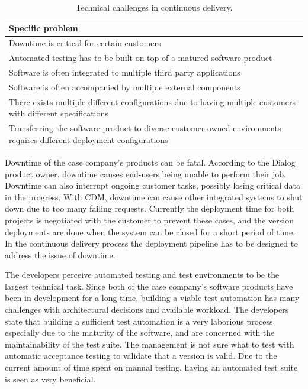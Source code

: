 \documentclass[english, grading]{tktltiki2}
\theoremstyle{definition}
\theoremstyle{remark}
\begin{document}
\begin{center}
\begin{table}[htb]
    \begin{tabular}{ | p{12cm} |}
    \hline
    \textbf{Specific problem} \\ \hline
    Downtime is critical for certain customers \\ \hline
    Automated testing has to be built on top of a matured software product \\ \hline
    Software is often integrated to multiple third party applications \\ \hline
    Software is often accompanied by multiple external components \\ \hline
    There exists multiple different configurations due to having multiple customers with different specifications \\ \hline
    Transferring the software product to diverse customer-owned environments requires different deployment configurations \\ 
    \hline
    \end{tabular}
    \caption{Technical challenges in continuous delivery.}
    \end{table}
\end{center}
Downtime of the case company's products can be fatal. According to the Dialog product owner, downtime causes end-users being unable to perform their job. Downtime can also interrupt ongoing customer tasks, possibly losing critical data in the progress. With CDM, downtime can cause other integrated systems to shut down due to too many failing requests. Currently the deployment time for both projects is negotiated with the customer to prevent these cases, and the version deployments are done when the system can be closed for a short period of time. In the continuous delivery process the deployment pipeline has to be designed to address the issue of downtime.

The developers perceive automated testing and test environments to be the largest technical task. Since both of the case company's software products have been in development for a long time, building a viable test automation has many challenges with architectural decisions and available workload. The developers state that building a sufficient test automation is a very laborious process especially due to the maturity of the software, and are concerned with the maintainability of the test suite. The management is not sure what to test with automatic acceptance testing to validate that a version is valid. Due to the current amount of time spent on manual testing, having an automated test suite is seen as very beneficial.%
\end{document}
